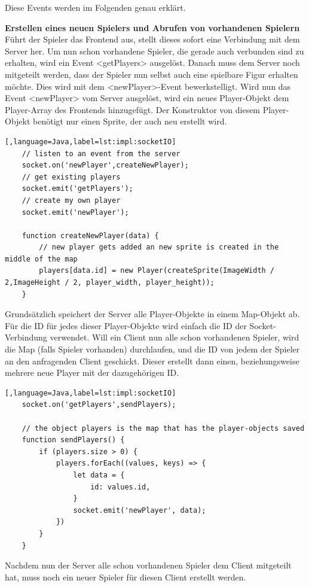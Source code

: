 Diese Events werden im Folgenden genau erklärt.

\textbf{Erstellen eines neuen Spielers und Abrufen von vorhandenen Spielern} \\
Führt der Spieler das Frontend aus, stellt dieses sofort eine Verbindung mit dem Server her. Um nun schon vorhandene Spieler, die gerade auch verbunden sind zu erhalten, wird ein Event <getPlayers> ausgelöst.
Danach muss dem Server noch mitgeteilt werden, dass der Spieler nun selbst auch eine spielbare Figur erhalten möchte. Dies wird mit dem <newPlayer>-Event bewerkstelligt.
Wird nun das Event <newPlayer> vom Server ausgelöst, wird ein neues Player-Objekt dem Player-Array des Frontends hinzugefügt. Der Konstruktor von diesem Player-Objekt benötigt nur einen Sprite, der auch neu erstellt wird.
\begin{lstlisting}[,language=Java,label=lst:impl:socketIO]
    // listen to an event from the server
    socket.on('newPlayer',createNewPlayer);
    // get existing players
    socket.emit('getPlayers');
    // create my own player
    socket.emit('newPlayer');

    function createNewPlayer(data) {
        // new player gets added an new sprite is created in the middle of the map
        players[data.id] = new Player(createSprite(ImageWidth / 2,ImageHeight / 2, player_width, player_height));
    }
\end{lstlisting}

Grundsätzlich speichert der Server alle Player-Objekte in einem Map-Objekt ab.
Für die ID für jedes dieser Player-Objekte wird einfach die ID der Socket-Verbindung verwendet. Will ein Client nun alle schon vorhandenen Spieler, wird die Map (falls Spieler vorhanden) durchlaufen, und die ID von jedem der Spieler an den anfragenden Client geschickt.
Dieser erstellt dann einen, beziehungsweise mehrere neue Player mit der dazugehörigen ID.

\begin{lstlisting}[,language=Java,label=lst:impl:socketIO]
    socket.on('getPlayers',sendPlayers);

    // the object players is the map that has the player-objects saved
    function sendPlayers() {
        if (players.size > 0) {
            players.forEach((values, keys) => {
                let data = {
                    id: values.id,
                }
                socket.emit('newPlayer', data);
            })
        }
    }
\end{lstlisting}

Nachdem nun der Server alle schon vorhandenen Spieler dem Client mitgeteilt hat, muss noch ein neuer Spieler für diesen Client erstellt werden.

